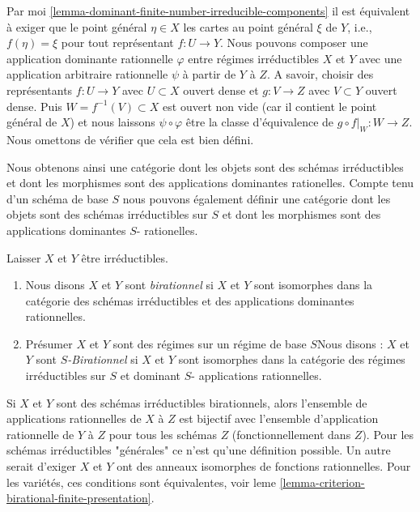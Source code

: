 \noindent

Par moi \ref{lemma-dominant-finite-number-irreducible-components}
il est équivalent à exiger que le point général $\eta \in X$
les cartes au point général $\xi$ de $Y$, i.e., $f(\eta) = \xi$ pour tout représentant $f : U \to Y$. Nous pouvons composer une application dominante rationnelle
$\varphi$ entre régimes irréductibles $X$ et $Y$ avec une application arbitraire rationnelle $\psi$ à partir de $Y$ à $Z$. A savoir, choisir des représentants $f : U \to Y$ avec $U \subset X$ ouvert dense et $g : V \to Z$ avec $V \subset Y$ ouvert dense. Puis
$W = f^{-1}(V) \subset X$ est ouvert non vide (car il contient le point général de $X$) et nous laissons $\psi \circ \varphi$ être la classe d'équivalence de $g \circ f|_W : W \to Z$. Nous omettons de vérifier que cela est bien défini.

\medskip\noindent
Nous obtenons ainsi une catégorie dont les objets sont des schémas irréductibles et dont les morphismes sont des applications dominantes rationelles. Compte tenu d'un schéma de base $S$ nous pouvons également définir une catégorie dont les objets sont des schémas irréductibles sur $S$ et dont les morphismes sont des applications dominantes $S$- rationelles.

\begin{definition}

\label{definition-birational-schemes}

Laisser $X$ et $Y$ être irréductibles.

\begin{enumerate}

\item Nous disons $X$ et $Y$ sont {\it birationnel} si $X$ et $Y$ sont isomorphes dans la catégorie des schémas irréductibles et des applications dominantes rationnelles.
\item Présumer $X$ et $Y$ sont des régimes sur un régime de base $S$Nous disons : $X$ et $Y$ sont {\it  $S$-Birationnel} si $X$ et $Y$ sont isomorphes dans la catégorie des régimes irréductibles sur $S$ et dominant $S$- applications rationnelles.

\end{enumerate}

\end{definition}

\noindent
Si $X$ et $Y$ sont des schémas irréductibles birationnels, alors l'ensemble de applications rationnelles de $X$ à $Z$ est bijectif avec l'ensemble d'application rationnelle de $Y$ à $Z$ pour tous les schémas $Z$ (fonctionnellement dans $Z$). Pour les schémas irréductibles "générales" ce n'est qu'une définition possible. Un autre serait d'exiger $X$ et $Y$ ont des anneaux isomorphes de fonctions rationnelles. Pour les variétés, ces conditions sont équivalentes, voir leme \ref{lemma-criterion-birational-finite-presentation}.

